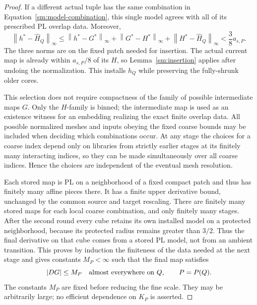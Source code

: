 \documentclass[11pt]{article}
\numberwithin{equation}{section}
\theoremstyle{definition}
\theoremstyle{remark}
\begin{document}
\begin{proof}
If a different actual tuple has the same
combination in Equation~\eqref{sm:model-combination}, this
single model agrees with all of its prescribed
PL overlap data.  Moreover,
\begin{equation}
 \label{sm:reuse-error}
 \left\lVert h^*-\widehat H_Q\right\rVert_{\infty}
 \le \left\lVert h^*-G^*\right\rVert_{\infty}
     +\left\lVert G^*-H^*\right\rVert_{\infty}
     +\left\lVert H^*-\widehat H_Q\right\rVert_{\infty}
 <\frac38 a_{s,P}.
\end{equation}
The three norms are on the fixed patch needed
for insertion.  The actual current map is
already within $a_{s,P}/8$ of its $H$, so
Lemma~\ref{sm:insertion} applies after undoing
the normalization.  This installs $h_Q$ while
preserving the fully-shrunk older cores.

This selection does not require compactness of
the family of possible intermediate maps $G$.
Only the $H$-family is binned; the intermediate
map is used as an existence witness for an
embedding realizing the exact finite overlap
data.  All possible normalized meshes and
inputs obeying the fixed coarse bounds may
be included when deciding which combinations
occur.  At any stage the choices for a coarse
index depend only on libraries from strictly
earlier stages at its finitely many interacting
indices, so they can be made simultaneously
over all coarse indices.  Hence the choices are independent of
the eventual mesh resolution.

Each stored map is PL on a neighborhood of a
fixed compact patch and thus has finitely many
affine pieces there.  It has a finite upper
derivative bound, unchanged by the common source and target
rescaling.  There are finitely many
stored maps for each local coarse combination,
and only finitely many stages.  After the second round every cube
retains its own installed model on a protected neighborhood,
because its protected radius remains greater than $3/2$.
Thus the final derivative on that cube comes from a stored PL
model, not from an ambient transition.  This proves by induction
the finiteness of the data needed at the next stage and gives
constants $M_P<\infty$ such that the final map satisfies
\begin{equation}
 \label{sm:model-derivative-bound}
 |DG|\le M_P\quad\hbox{almost everywhere on }Q,
 \qquad P=P(Q).
\end{equation}
The constants $M_P$ are fixed before reducing
the fine scale.  They may be arbitrarily large;
no efficient dependence on $K_P$ is asserted.


\end{proof}
\end{document}
